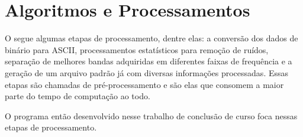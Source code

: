 \chapter{Algoritmos e Processamentos}
\label{cap-algoritmos}
    
    O \MT segue algumas etapas de processamento, dentre elas: a conversão dos dados de binário para ASCII, processamentos estatísticos para remoção de ruídos, separação de melhores bandas adquiridas em diferentes faixas de frequência e a geração de um arquivo padrão já com diversas informações processadas. Essas etapas são chamadas de pré-processamento e são elas que consomem a maior parte do tempo de computação ao todo.
    
    O programa então desenvolvido nesse trabalho de conclusão de curso foca nessas etapas de processamento. %
    
    
    
    
